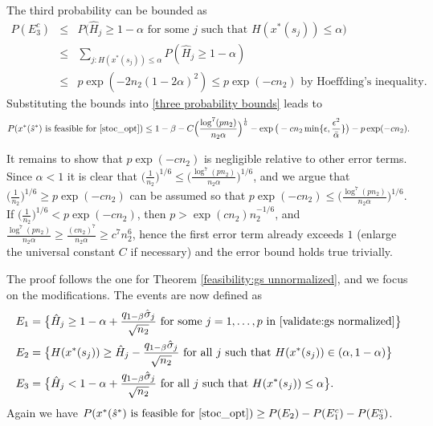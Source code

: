 \documentclass[mnsc,blindrev]{informs4} %
\begin{document}
The third probability can be bounded as
\begin{eqnarray*}
P(E_3^c)&\leq&P\big(\hat H_j\geq 1-\alpha \text{ for some $j$ such that }H(x^*(s_j))\leq \alpha\big)\\
&\leq&\sum_{j:H(x^*(s_j))\leq \alpha}P(\hat H_j\geq 1-\alpha)\\
&\leq&p\exp(-2n_2(1-2\alpha)^2)\leq p\exp(-cn_2)\text{\ \ by Hoeffding's inequality}.
\end{eqnarray*}
Substituting the bounds into \eqref{three probability bounds} leads to
\begin{equation*}
P(x^*(\hat s^*)\text{ is feasible for \eqref{stoc_opt}})\leq 1-\beta-C\Big(\frac{\log^7(pn_2)}{n_2\alpha}\Big)^{\frac{1}{6}}-\exp\big(-cn_2\min\{\epsilon,\frac{\epsilon^2}{\bar{\alpha}}\}\big)-p\exp(-cn_2).
\end{equation*}

It remains to show that $p\exp(-cn_2)$ is negligible relative to other error terms. Since $\alpha<1$ it is clear that $\big(\frac{1}{n_2}\big)^{1/6}\leq \Big(\frac{\log^7(pn_2)}{n_2\alpha}\Big)^{1/6}$, and we argue that $\big(\frac{1}{n_2}\big)^{1/6}\geq p\exp(-cn_2)$ can be assumed so that $p\exp(-cn_2)\leq \Big(\frac{\log^7(pn_2)}{n_2\alpha}\Big)^{1/6}$. If $\big(\frac{1}{n_2}\big)^{1/6}< p\exp(-cn_2)$, then $p>\exp(cn_2)n_2^{-1/6}$, and $\frac{\log^7(pn_2)}{n_2\alpha}\geq \frac{(cn_2)^7}{n_2\alpha}\geq c^7n_2^6$, hence the first error term already exceeds $1$ (enlarge the universal constant $C$ if necessary) and the error bound holds true trivially.\hfill\Halmos

The proof follows the one for Theorem \ref{feasibility:gs unnormalized}, and we focus on the modifications. The events are now defined as
\begin{align*}
E_1&=\big\{\hat H_j\geq 1-\alpha + \frac{ q_{1-\beta}\hat\sigma_j}{\sqrt{n_2}}\text{ for some }j=1,\ldots,p\text{ in \eqref{validate:gs normalized}}\big\}\\
E_2&=\big\{H(x^*(s_j))\geq\hat H_j-  \frac{ q_{1-\beta}\hat\sigma_j}{\sqrt{n_2}}\text{ for all $j$ such that }H(x^*(s_j))\in(\alpha,1-\alpha)\big\}\\
E_3&=\big\{\hat H_j<1-\alpha + \frac{ q_{1-\beta}\hat\sigma_j}{\sqrt{n_2}}\text{ for all $j$ such that }H(x^*(s_j))\leq \alpha\big\}.
\end{align*}
Again we have $P(x^*(\hat s^*)\text{ is feasible for \eqref{stoc_opt}})\geq P(E_2)-P(E_1^c)-P(E_3^c)$.
\end{document}
